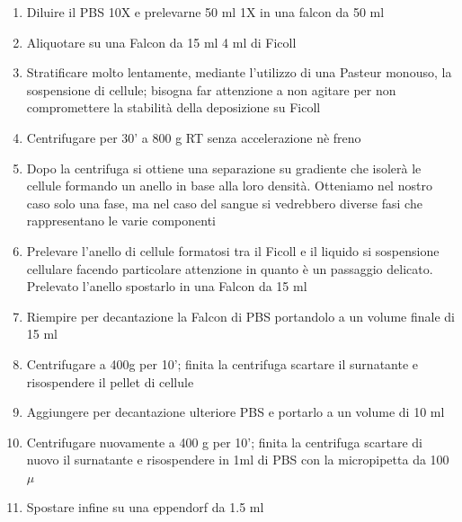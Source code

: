 \begin{enumerate}
    \item Diluire il PBS 10X e prelevarne 50 ml 1X in una falcon da 50 ml
    \item Aliquotare su una Falcon da 15 ml 4 ml di Ficoll
    \item Stratificare molto lentamente, mediante l'utilizzo di una Pasteur monouso, la sospensione di cellule; bisogna far attenzione a non agitare per non compromettere la stabilità della deposizione su Ficoll
    \item Centrifugare per 30' a 800 g RT senza accelerazione nè freno
    \item Dopo la centrifuga si ottiene una separazione su gradiente che isolerà le cellule formando un anello in base alla loro densità. Otteniamo nel nostro caso solo una fase, ma nel caso del sangue si vedrebbero diverse fasi che rappresentano le varie componenti
    \item Prelevare l'anello di cellule formatosi tra il Ficoll e il liquido si sospensione cellulare facendo particolare attenzione in quanto è un passaggio delicato. Prelevato l'anello spostarlo in una Falcon da 15 ml
    \item Riempire per decantazione la Falcon di PBS portandolo a un volume finale di 15 ml
    \item Centrifugare a 400g per 10'; finita la centrifuga scartare il surnatante e risospendere il pellet di cellule
    \item Aggiungere per decantazione ulteriore PBS e portarlo a un volume di 10 ml
    \item Centrifugare nuovamente a 400 g per 10'; finita la centrifuga scartare di nuovo il surnatante e risospendere in 1ml di PBS con la micropipetta da 100 $\mu$
    \item Spostare infine su una eppendorf da 1.5 ml
\end{enumerate}

